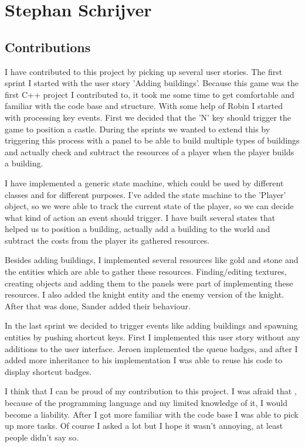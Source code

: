 \section{Stephan Schrijver}
\subsection{Contributions}
I have contributed to this project by picking up several user stories.
The first sprint I started with the user story 'Adding buildings'. Because this game was the first C++ project I contributed to, it took me some time to get comfortable and familiar with the code base and structure. With some help of Robin I started with processing key events. First we decided that the 'N' key should trigger the game to position a castle. During the sprints we wanted to extend this by triggering this process with a panel to be able to build multiple types of buildings and actually check and subtract the resources of a player when the player builds a building.

I have implemented a generic state machine, which could be used by different classes and for different purposes. I've added the state machine to the 'Player' object, so we were able to track the current state of the player, so we can decide what kind of action an event should trigger. I have built several states that helped us to position a building, actually add a building to the world and subtract the costs from the player its gathered resources.

Besides adding buildings, I implemented several resources like gold and stone and the entities which are able to gather these resources. Finding/editing textures, creating objects and adding them to the panels were part of implementing these resources. I also added the knight entity and the enemy version of the knight. After that was done, Sander added their behaviour.

In the last sprint we decided to trigger events like adding buildings and spawning entities by pushing shortcut keys. First I implemented this user story without any additions to the user interface. Jeroen implemented the queue badges, and after I added more inheritance to his implementation I was able to reuse his code to display shortcut badges.

I think that I can be proud of my contribution to this project. I was afraid that , because of the programming language and my limited knowledge of it, I would become a liability. After I got more familiar with the code base I was able to pick up more tasks. Of course I asked a lot but I hope it wasn't annoying, at least people didn't say so.

